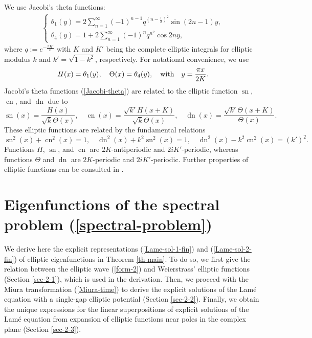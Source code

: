 \documentclass[12pt,reqno]{amsart}
\numberwithin{equation}{section}
\DeclareMathOperator{\sn}{sn}
\DeclareMathOperator{\cn}{cn}
\DeclareMathOperator{\dn}{dn}
\begin{document}
We use Jacobi's theta functions:
 \begin{align*}
\left\{ \begin{array}{l} 
\theta_1(y) = 2 \sum\limits_{n=1}^{\infty} (-1)^{n-1} q^{(n-\frac{1}{2})^2} \sin(2n-1) y, \\
\theta_4(y) = 1 + 2 \sum\limits_{n=1}^{\infty} (-1)^{n} q^{n^2} \cos 2n y,
\end{array} \right.
\end{align*}
where $q := e^{-\frac{\pi K'}{K}}$ with $K$ and $K'$ being the complete elliptic integrals for elliptic modulus $k$ and $k' = \sqrt{1-k^2}$, respectively. For notational convenience, we use 
\begin{equation}
\label{Jacobi-theta}
H(x) = \theta_1(y), \quad \Theta(x) = \theta_4(y), \quad \mbox{\rm with} \quad y = \frac{\pi x}{2 K}.
\end{equation}
Jacobi's theta functions (\ref{Jacobi-theta}) are related to the elliptic function $\sn$, $\cn$, and $\dn$ due to
\begin{equation}
\label{Jacobi-sn}
\sn(x) = \frac{H(x)}{\sqrt{k} \Theta(x)}, \quad \cn(x) =  \frac{\sqrt{k'} H(x+K)}{\sqrt{k} \Theta(x)}, \quad \dn(x) = \frac{\sqrt{k'} \Theta(x + K)}{\Theta(x)}.
\end{equation}
These elliptic functions are related by the fundamental relations 
\begin{equation}
\label{fund-rel}
\sn^2(x) + \cn^2(x) = 1, \quad \dn^2(x) + k^2 \sn^2(x) = 1, \quad \dn^2(x) - k^2 \cn^2(x) = (k')^2.
\end{equation}
Functions $H$, $\sn$, and $\cn$ are $2K$-antiperiodic and $2iK'$-periodic, whereas functions $\Theta$ and $\dn$ are $2K$-periodic and $2iK'$-periodic. Further properties of elliptic functions can be consulted in \cite{Lawden}.


\section{Eigenfunctions of the spectral problem (\ref{spectral-problem})}
\label{sec-2}

We derive here the explicit representations (\ref{Lame-sol-1-fin}) and (\ref{Lame-sol-2-fin}) of elliptic eigenfunctions in Theorem \ref{th-main}.  
To do so, we first give the relation between the elliptic wave (\ref{form-2}) and Weierstrass' elliptic functions (Section \ref{sec-2-1}), which is 
used in the derivation. Then, we proceed with the Miura transformation (\ref{Miura-time}) to derive the explicit solutions of the Lam\'{e} equation with a single-gap 
elliptic potential (Section \ref{sec-2-2}). Finally, we obtain the unique 
expressions for the linear superpositions of explicit solutions 
of the Lam\'{e} equation from expansion of elliptic functions near poles 
in the complex plane (Section \ref{sec-2-3}).
\end{document}
